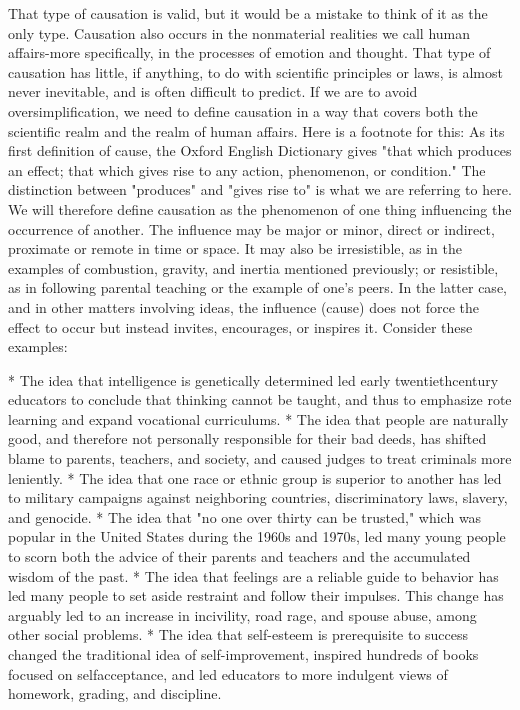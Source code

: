 \documentclass{book}
\begin{document}
That type of causation is valid, but it would be a mistake to think of it as the only type. Causation also occurs in the nonmaterial realities we call human affairs-more specifically, in the processes of emotion and thought. That type of causation has little, if anything, to do with scientific principles or laws, is almost never inevitable, and is often difficult to predict.  If we are to avoid oversimplification, we need to define causation in a way that covers both the scientific realm and the realm of human affairs.  Here is a footnote for this: As its first definition of cause, the Oxford English Dictionary gives "that which produces an effect; that which gives rise to any action, phenomenon, or condition." The distinction between "produces" and "gives rise to" is what we are referring to here. We will therefore define causation as the phenomenon of one thing influencing the occurrence of another. The influence may be major or minor, direct or indirect, proximate or remote in time or space. It may also be irresistible, as in the examples of combustion, gravity, and inertia mentioned previously; or resistible, as in following parental teaching or the example of one’s peers. In the latter case, and in other matters involving ideas, the influence (cause) does not force the effect to occur but instead invites, encourages, or inspires it. Consider these examples:

* The idea that intelligence is genetically determined led early twentiethcentury educators to conclude that thinking cannot be taught, and thus to emphasize rote learning and expand vocational curriculums.
* The idea that people are naturally good, and therefore not personally responsible for their bad deeds, has shifted blame to parents, teachers, and society, and caused judges to treat criminals more leniently.
* The idea that one race or ethnic group is superior to another has led to military campaigns against neighboring countries, discriminatory laws, slavery, and genocide.
* The idea that "no one over thirty can be trusted," which was popular in the United States during the 1960s and 1970s, led many young people to scorn both the advice of their parents and teachers and the accumulated wisdom of the past.
* The idea that feelings are a reliable guide to behavior has led many people to set aside restraint and follow their impulses. This change has arguably led to an increase in incivility, road rage, and spouse abuse, among other social problems.
* The idea that self-esteem is prerequisite to success changed the traditional idea of self-improvement, inspired hundreds of books focused on selfacceptance, and led educators to more indulgent views of homework, grading, and discipline.
\end{document}
